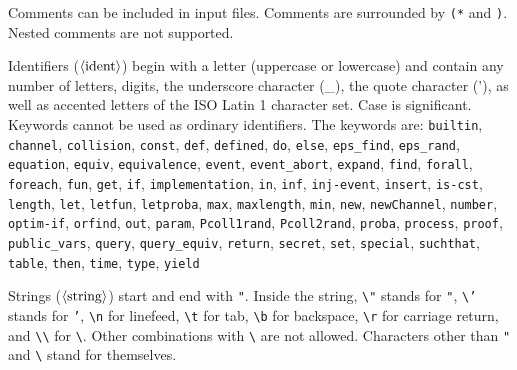 
\ifchannels

\def\iprocess{\nonterm{iprocess}}
\def\oprocess{\nonterm{oprocess}}

\else

\def\iprocess{\nonterm{odef}}
\def\oprocess{\nonterm{obody}}

\fi

\def\fungroup{\nonterm{ogroup}}
\def\funmode{\nonterm{omode}}
\def\funbody{\nonterm{obody\_equiv}}
\def\Resavt{\texttt{new\ }\nonterm{ident} \texttt{:}\nonterm{ident}}
\def\Resa#1#2{\texttt{new\ }{#1}\texttt{:}{#2}}
\def\Resbvt{\nonterm{ident}\texttt{ <-R }\nonterm{ident}}
\def\Resb#1#2{{#1}\texttt{ <-R }{#2}}
\def\yield{\texttt{yield}}

\def\epsrand#1{\texttt{eps\_rand(}#1\texttt{)}}

\newcommand{\eqt}{\mathrel{\texttt{=}}}
\newcommand{\leqt}{\mathrel{\texttt{<=}}}


Comments can be included in input files. Comments are surrounded by
{\tt (*} and {\tt *)}. Nested comments are not supported.

Identifiers ($\langle\textrm{ident}\rangle$) begin with a letter (uppercase or lowercase) and contain
any number of letters, digits, the underscore character (\_),
the quote character ('), as well as accented letters of the ISO Latin 1
character set. Case is significant. 
Keywords cannot be used as ordinary identifiers. The keywords are:
{\tt builtin}, {\tt channel}, 
{\tt collision}, {\tt const}, {\tt def}, 
{\tt defined}, {\tt do}, {\tt else}, {\tt eps\_find}, 
{\tt eps\_rand}, {\tt equation}, {\tt equiv}, {\tt equivalence}, 
{\tt event}, {\tt event\string_abort}, {\tt expand}, {\tt find}, 
{\tt forall}, {\tt foreach}, {\tt fun}, 
{\tt get}, {\tt if}, {\tt implementation}, {\tt in}, 
{\tt inf}, %
{\tt inj-event}, 
{\tt insert}, {\tt is-cst}, {\tt length}, {\tt let}, {\tt letfun}, {\tt letproba}, {\tt max}, {\tt maxlength},
{\tt min}, {\tt new}, {\tt newChannel}, {\tt number}, {\tt optim-if},
{\tt orfind}, 
{\tt out}, {\tt param}, {\tt Pcoll1rand}, {\tt Pcoll2rand}, 
{\tt proba}, {\tt process}, 
{\tt proof}, {\tt public\_vars}, {\tt query}, {\tt query\_equiv}, {\tt return},
{\tt secret}, {\tt set}, {\tt special}, {\tt suchthat}, {\tt table}, 
{\tt then}, {\tt time}, {\tt type}, {\tt yield}%

\newcommand{\bs}{\textbackslash}

Strings ($\langle\textrm{string}\rangle$) start and end with \texttt{"}. 
Inside the string, \texttt{\bs "} stands for \texttt{"},
\texttt{\bs '} stands for \texttt{'},
\texttt{\bs n} for linefeed, \texttt{\bs t} for tab,
\texttt{\bs b} for backspace, \texttt{\bs r} for carriage return, and 
\texttt{\bs \bs} for \texttt{\bs}.
Other combinations with \texttt{\bs} are not allowed.
Characters other than \texttt{"} and \texttt{\bs} stand for themselves.

